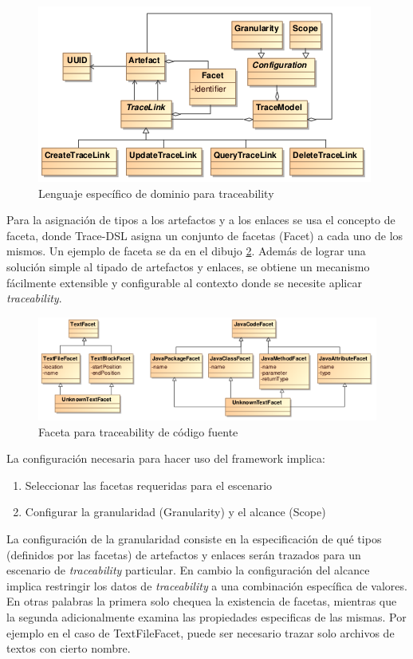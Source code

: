 \documentclass[a4paper,12pt,oneside,spanish]{book}
\begin{document}
\begin{figure}[hbtp]
\centering
\includegraphics[scale=.93]{./img/Trace-DSL}
\caption{Lenguaje específico de dominio para traceability}
\label{fig:DSLTrace}
\end{figure}

Para la asignación de tipos a los artefactos y a los enlaces se usa el concepto de faceta, donde Trace-DSL asigna un conjunto de facetas (Facet) a cada uno de los mismos. Un ejemplo de faceta se da en el dibujo \ref{fig:FacetaCodigoFuente}. Además de lograr una solución simple al tipado de artefactos y enlaces, se obtiene un mecanismo fácilmente extensible y configurable al contexto donde se necesite aplicar \textit{traceability}.

\begin{figure}[hbtp]
\centering
\includegraphics[scale=.72]{./img/Faceta}
\caption{Faceta para traceability de código fuente}
\label{fig:FacetaCodigoFuente}
\end{figure}

La configuración necesaria para hacer uso del framework implica:

\begin{enumerate}
\item Seleccionar las facetas requeridas para el escenario
\item Configurar la granularidad (Granularity) y el alcance (Scope)
\end{enumerate}

La configuración de la granularidad consiste en la especificación de qué tipos (definidos por las facetas) de artefactos y enlaces serán trazados para un escenario de \textit{traceability} particular. En cambio la configuración del alcance implica restringir los datos de \textit{traceability} a una combinación específica de valores. En otras palabras la primera solo chequea la existencia de facetas, mientras que la segunda adicionalmente examina las propiedades especificas de las mismas. Por ejemplo en el caso de TextFileFacet, puede ser necesario trazar solo archivos de textos con cierto nombre.
\end{document}
